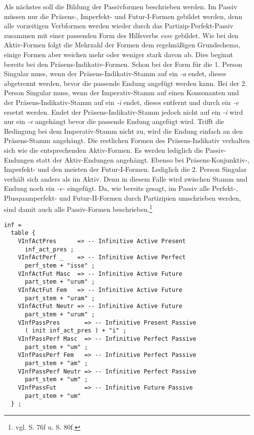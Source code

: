 Als nächstes soll die Bildung der Passivformen beschrieben werden. Im Passiv müssen nur die Präsens-, Imperfekt- und Futur-I-Formen gebildet werden, denn alle vorzeitigen Verbformen werden wieder durch das Partizip-Perfekt-Passiv zusammen mit einer passenden Form des Hilfsverbs \textit{esse} gebildet. Wie bei den Aktiv-Formen folgt die Mehrzahl der Formen dem regelmäßigen Grundschema, einige Formen aber weichen mehr oder weniger stark davon ab. Dies beginnt bereits bei den Präsens-Indikativ-Formen. Schon bei der Form für die 1. Person Singular muss, wenn der Präsens-Indikativ-Stamm auf ein \textit{-a} endet, dieses abgetrennt werden, bevor die passende Endung angefügt werden kann. Bei der 2. Person Singular muss, wenn der Imperativ-Stamm auf einen Konsonanten und der Präsens-Indikativ-Stamm auf ein \textit{-i} endet, dieses entfernt und durch ein \textit{-e} ersetzt werden. Endet der Präsens-Indikativ-Stamm jedoch nicht auf ein \textit{-i} wird nur ein \textit{-e} angehängt bevor die passende Endung angefügt wird. Trifft die Bedingung bei dem Imperativ-Stamm nicht zu, wird die Endung einfach an den Präsens-Stamm angehängt. Die restlichen Formen des Präsens-Indikativ verhalten sich wie die entsprechenden Aktiv-Formen. Es werden lediglich die Passiv-Endungen statt der Aktiv-Endungen angehängt. Ebenso bei Präsens-Konjunktiv-, Imperfekt- und den meisten der Futur-I-Formen. Lediglich die 2. Person Singular verhält sich anders als im Aktiv. Denn in diesem Falle wird zwischen Stamm und Endung noch ein \textit{-e-} eingefügt. Da, wie bereits gesagt, im Passiv alle Perfekt-, Plusquamperfekt- und Futur-II-Formen durch Partizipien umschrieben werden, sind damit auch alle Passiv-Formen beschrieben.\footnote{vgl. \cite{BAYER-LINDAUER1994} S. 76f u. S. 80f.} \par
\begin{lstlisting}[float=h!tp,caption={Ausschnitt aus der Funktion \texttt{mkVerb} um Infinitiv-Verbformen zu bilden (vgl. \textbf{ResLat.gf})},label={GF-Res-MkVerb-Inf},basicstyle=\small]
inf = 
  table {
    VInfActPres      => -- Infinitive Active Present
      inf_act_pres ;
    VInfActPerf _    => -- Infinitive Active Perfect
      perf_stem + "isse" ;
    VInfActFut Masc  => -- Infinitive Active Future
      part_stem + "urum" ;
    VInfActFut Fem   => -- Infinitive Active Future
      part_stem + "uram" ; 
    VInfActFut Neutr => -- Infinitive Active Future
      part_stem + "urum" ;
    VInfPassPres       => -- Infinitive Present Passive
      ( init inf_act_pres ) + "i" ;
    VInfPassPerf Masc  => -- Infinitive Perfect Passive
      part_stem + "um" ;
    VInfPassPerf Fem   => -- Infinitive Perfect Passive
      part_stem + "am" ;
    VInfPassPerf Neutr => -- Infinitive Perfect Passive
      part_stem + "um" ;
    VInfPassFut        => -- Infinitive Future Passive
      part_stem + "um"
  } ;
\end{lstlisting}
